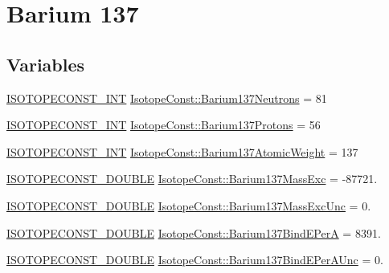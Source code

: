 \hypertarget{group___isotope_const-_barium-_ba137}{}\section{Barium 137}
\label{group___isotope_const-_barium-_ba137}
\subsection*{Variables}
\begin{DoxyCompactItemize}
\item 
\mbox{\hyperlink{group___isotope_const-_macros_ga5f18360b3e99483a35c32d789e62621c}{I\+S\+O\+T\+O\+P\+E\+C\+O\+N\+S\+T\+\_\+\+I\+NT}} \mbox{\hyperlink{group___isotope_const-_barium-_ba137_gaeb06c4c0d20d4e82bdf382552cfea664}{Isotope\+Const\+::\+Barium137\+Neutrons}} = 81
\item 
\mbox{\hyperlink{group___isotope_const-_macros_ga5f18360b3e99483a35c32d789e62621c}{I\+S\+O\+T\+O\+P\+E\+C\+O\+N\+S\+T\+\_\+\+I\+NT}} \mbox{\hyperlink{group___isotope_const-_barium-_ba137_gaa474ee2f40d6f6334c39bde65b2d4fc3}{Isotope\+Const\+::\+Barium137\+Protons}} = 56
\item 
\mbox{\hyperlink{group___isotope_const-_macros_ga5f18360b3e99483a35c32d789e62621c}{I\+S\+O\+T\+O\+P\+E\+C\+O\+N\+S\+T\+\_\+\+I\+NT}} \mbox{\hyperlink{group___isotope_const-_barium-_ba137_ga79908e640b9cebea33a4490e7931a5ba}{Isotope\+Const\+::\+Barium137\+Atomic\+Weight}} = 137
\item 
\mbox{\hyperlink{group___isotope_const-_macros_ga8f45a7272ce02c0b4c65c44636ed719a}{I\+S\+O\+T\+O\+P\+E\+C\+O\+N\+S\+T\+\_\+\+D\+O\+U\+B\+LE}} \mbox{\hyperlink{group___isotope_const-_barium-_ba137_ga1e39fc97532302801b942f3fa8a0667f}{Isotope\+Const\+::\+Barium137\+Mass\+Exc}} = -\/87721.
\item 
\mbox{\hyperlink{group___isotope_const-_macros_ga8f45a7272ce02c0b4c65c44636ed719a}{I\+S\+O\+T\+O\+P\+E\+C\+O\+N\+S\+T\+\_\+\+D\+O\+U\+B\+LE}} \mbox{\hyperlink{group___isotope_const-_barium-_ba137_ga2c714b62de7db36ffbff74812cd0af22}{Isotope\+Const\+::\+Barium137\+Mass\+Exc\+Unc}} = 0.
\item 
\mbox{\hyperlink{group___isotope_const-_macros_ga8f45a7272ce02c0b4c65c44636ed719a}{I\+S\+O\+T\+O\+P\+E\+C\+O\+N\+S\+T\+\_\+\+D\+O\+U\+B\+LE}} \mbox{\hyperlink{group___isotope_const-_barium-_ba137_gaac56c59211a8ae13a754c9a0b112b710}{Isotope\+Const\+::\+Barium137\+Bind\+E\+PerA}} = 8391.
\item 
\mbox{\hyperlink{group___isotope_const-_macros_ga8f45a7272ce02c0b4c65c44636ed719a}{I\+S\+O\+T\+O\+P\+E\+C\+O\+N\+S\+T\+\_\+\+D\+O\+U\+B\+LE}} \mbox{\hyperlink{group___isotope_const-_barium-_ba137_ga71c291092de69b7a518a0f233574d8fc}{Isotope\+Const\+::\+Barium137\+Bind\+E\+Per\+A\+Unc}} = 0.

\end{DoxyCompactItemize}
